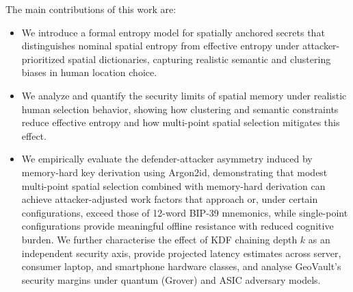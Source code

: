 \documentclass[journal,article,submit,pdftex,moreauthors]{Definitions/mdpi}
\newcommand{\add}[1]{#1}
\newcommand{\remove}[1]{}
\newcommand{\add}[1]{\added{#1}}
\newcommand{\remove}[1]{\deleted{#1}}
\begin{document}
\remove{The contributions of this work are threefold:}\add{The main contributions of this work are:}
\begin{itemize}
\item We introduce a formal entropy model for spatially anchored secrets that distinguishes nominal spatial entropy from effective entropy under attacker-prioritized spatial dictionaries, capturing realistic semantic and clustering biases in human location choice.
\item We analyze and quantify the security limits of spatial memory under realistic human selection behavior, showing how clustering and semantic constraints reduce effective entropy and how multi-point spatial selection mitigates this effect.
\item We empirically evaluate the defender-attacker asymmetry induced by memory-hard key derivation using Argon2id, demonstrating that modest multi-point spatial selection combined with memory-hard derivation can achieve attacker-adjusted work factors that approach or, under certain configurations, exceed those of 12-word BIP-39 mnemonics, while single-point configurations provide meaningful offline resistance with reduced cognitive burden. We further characterise the effect of KDF chaining depth $k$ as an independent security axis, provide projected latency estimates across server, consumer laptop, and smartphone hardware classes, and analyse GeoVault's security margins under quantum (Grover) and ASIC adversary models.
\end{itemize}
\end{document}
